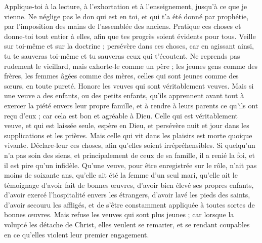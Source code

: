 \begin{multicols}{2}
Applique-toi à la lecture, à l'exhortation et à l’enseignement, jusqu'à ce que je vienne.
Ne néglige pas le don qui est en toi, et qui t'a été donné par prophétie, par l'imposition des mains de l’assemblée des anciens.
Pratique ces choses et donne-toi tout entier à elles, afin que tes progrès soient évidents pour tous.
Veille sur toi-même et sur la doctrine ; persévère dans ces choses, car en agissant ainsi, tu te sauveras toi-même et tu sauveras ceux qui t'écoutent.
\VerseOne{}Ne reprends pas rudement le vieillard, mais exhorte-le comme un père ; les jeunes gens comme des frères,
les femmes âgées comme des mères, celles qui sont jeunes comme des sœurs, en toute pureté.
Honore les veuves qui sont véritablement veuves.
Mais si une veuve a des enfants, ou des petits enfants, qu'ils apprennent avant tout à exercer la piété envers leur propre famille, et à rendre à leurs parents ce qu’ils ont reçu d’eux ; car cela est bon et agréable à Dieu.
Celle qui est véritablement veuve, et qui est laissée seule, espère en Dieu, et persévère nuit et jour dans les supplications et les prières.
Mais celle qui vit dans les plaisirs est morte quoique vivante.
Déclare-leur ces choses, afin qu'elles soient irrépréhensibles.
Si quelqu'un n'a pas soin des siens, et principalement de ceux de sa famille, il a renié la foi, et il est pire qu'un infidèle.
Qu’une veuve, pour être enregistrée sur le rôle, n’ait pas moins de soixante ans, qu’elle ait été la femme d’un seul mari,
qu’elle ait le témoignage d'avoir fait de bonnes œuvres, d'avoir bien élevé ses propres enfants, d'avoir exercé l’hospitalité envers les étrangers, d'avoir lavé les pieds des saints, d'avoir secouru les affligés, et de s'être constamment appliquée à toutes sortes de bonnes œuvres.
Mais refuse les veuves qui sont plus jeunes ; car lorsque la volupté les détache de Christ, elles veulent se remarier,
et se rendant coupables en ce qu’elles violent leur premier engagement.

\end{multicols}
